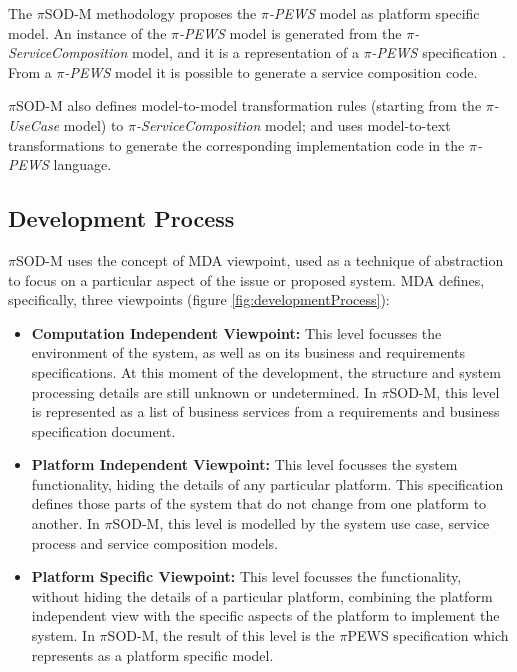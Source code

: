  The $\pi$SOD-M methodology proposes the \textit{$\pi$-PEWS} model as platform
 specific model. An instance of the \textit{$\pi$-PEWS} model is generated from
 the \textit{$\pi$-ServiceComposition} model, and it is a representation of a
 \textit{$\pi$-PEWS} specification \cite{BaCAM05,Placido2010LTPD}. From
 a \textit{$\pi$-PEWS} model it is possible to generate a service composition
 code.


  $\pi$SOD-M also defines model-to-model transformation rules (starting from
  the \textit{$\pi$-UseCase} model) to \textit{$\pi$-ServiceComposition} model;
  and uses model-to-text transformations to generate the corresponding
  implementation code in the \textit{$\pi$-PEWS} language. 
  


\subsection{Development Process}


$\pi$SOD-M uses the concept of MDA viewpoint, used as a technique of
abstraction to focus on a particular aspect of the issue or proposed system.
MDA defines, specifically, three viewpoints (figure
\ref{fig:developmentProcess}):

\begin{itemize}
  \item \textbf{Computation Independent Viewpoint:} This level focusses the
  environment of the system, as well as on its business and requirements
  specifications. At this moment of the development, the structure and system
  processing details are still unknown or undetermined. In $\pi$SOD-M, this
  level is represented as a list of business services from a requirements and
  business specification document. 
  \item \textbf{Platform Independent Viewpoint:} This level focusses the system
  functionality, hiding the details of any particular platform. This
  specification defines those parts of the system that do not
  change from one platform to another. In $\pi$SOD-M, this level is modelled by the system use case, service
  process and service composition models.
  \item \textbf{Platform Specific Viewpoint:} This level focusses the
  functionality, without hiding the details of a particular platform,
  combining the platform independent view with the specific aspects of the platform to
  implement the system.  In $\pi$SOD-M, the result of this level is the
  $\pi$PEWS specification \cite{Placido2010LTPD} which represents as a platform
  specific model.
\end{itemize}
 
